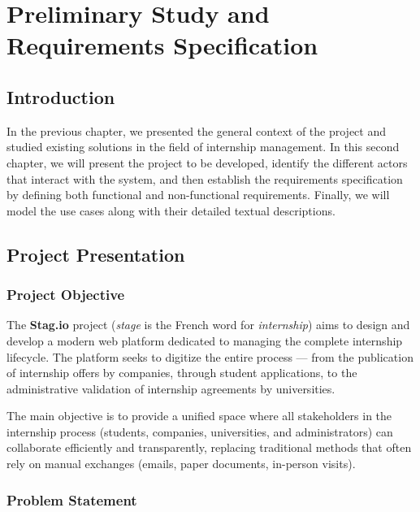 
\chapter{Preliminary Study and Requirements Specification}

\section{Introduction}

In the previous chapter, we presented the general context of the project and studied existing solutions in the field of internship management. In this second chapter, we will present the project to be developed, identify the different actors that interact with the system, and then establish the requirements specification by defining both functional and non-functional requirements. Finally, we will model the use cases along with their detailed textual descriptions.

\section{Project Presentation}

\subsection{Project Objective}

The \textbf{Stag.io} project (\textit{stage} is the French word for \textit{internship}) aims to design and develop a modern web platform dedicated to managing the complete internship lifecycle. The platform seeks to digitize the entire process --- from the publication of internship offers by companies, through student applications, to the administrative validation of internship agreements by universities.

The main objective is to provide a unified space where all stakeholders in the internship process (students, companies, universities, and administrators) can collaborate efficiently and transparently, replacing traditional methods that often rely on manual exchanges (emails, paper documents, in-person visits).

\subsection{Problem Statement}

